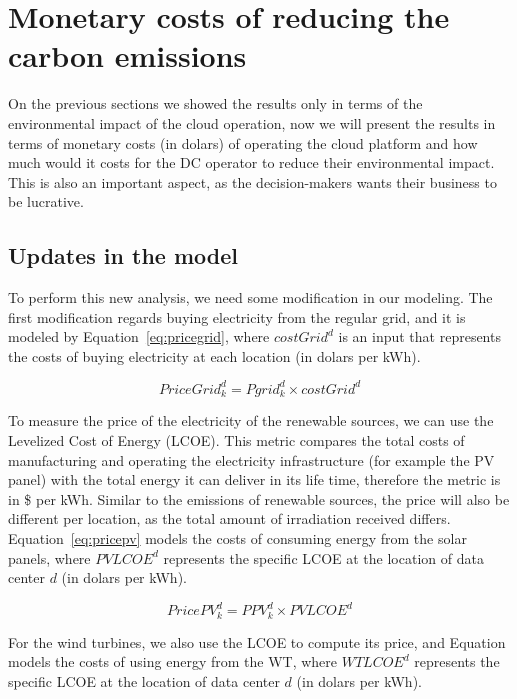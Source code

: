 \section{ Monetary costs of reducing the carbon emissions}

On the previous sections we showed the results only in terms of the environmental impact of the cloud operation, now we will present the results in terms of monetary costs (in dolars) of operating the cloud platform and how much would it costs for the DC operator to reduce their environmental impact. This is also an important aspect, as the decision-makers wants their business to be lucrative.

\subsection{Updates in the model}

To perform this new analysis, we need some modification in our modeling. The first modification regards buying electricity from the regular grid, and it is modeled by Equation~\eqref{eq:pricegrid}, where $costGrid^d$ is an input that represents the costs of buying electricity at each location (in dolars per kWh). 

\begin{equation} \label{eq:pricegrid}
 PriceGrid^d_k = Pgrid^d_k \times costGrid^d
\end{equation}

To measure the price of the electricity of the renewable sources, we can use the Levelized Cost of Energy (LCOE). This metric compares the total costs of manufacturing and operating the electricity infrastructure (for example the PV panel) with the total energy it can deliver in its life time, therefore the metric is in \$ per kWh. Similar to the  emissions of renewable sources, the price will also be different per location, as the total amount of irradiation received differs.  Equation~\eqref{eq:pricepv} models the costs of consuming energy from the solar panels, where $PVLCOE^d$ represents the specific LCOE at the location of data center $d$ (in dolars per kWh).

\begin{equation} \label{eq:pricepv}
  PricePV^d_k = PPV^d_k \times PVLCOE^d
\end{equation}


For the wind turbines, we also use the LCOE to compute its price, and Equation models the costs of using energy from the WT, where $WTLCOE^d$ represents the specific LCOE at the location of data center $d$ (in dolars per kWh).



